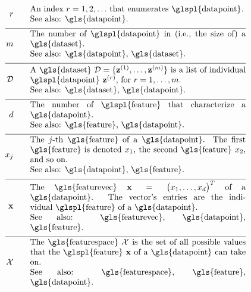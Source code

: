 \begin{align}
	\sampleidx \quad\quad & \parbox{.75\textwidth}{An index $\sampleidx=1,2,\ldots$ that 
		enumerates \glspl{datapoint}.
		\\ See also: \gls{datapoint}. }   \nonumber \\[2mm] \hline \nonumber\\[-5mm]
	\samplesize \quad\quad &\parbox{.75\textwidth}{The number of \glspl{datapoint} in (i.e., the size of) a \gls{dataset}.
		\\ See also: \gls{datapoint}, \gls{dataset}.} \nonumber \\[2mm] \hline \nonumber\\[-5mm] 
	\dataset \quad\quad & \parbox{.75\textwidth}{A \gls{dataset} $\dataset = \{ \datapoint^{(1)},\ldots, \datapoint^{(\samplesize)} \}$ 
		is a list of individual \glspl{datapoint} $\datapoint^{(\sampleidx)}$, for $\sampleidx=1,\ldots,\samplesize$.
		\\ See also: \gls{dataset}, \gls{datapoint}.}   \nonumber \\[2mm] \hline \nonumber\\[-5mm]
	\featurelen \quad\quad &\parbox{.75\textwidth}{The number of \glspl{feature} that characterize a \gls{datapoint}.
		\\ See also: \gls{feature}, \gls{datapoint}.}\nonumber \\[2mm] \hline \nonumber\\[-5mm]
	\feature_{\featureidx} \quad\quad &\parbox{.75\textwidth}{The $\featureidx$-th \gls{feature} of a \gls{datapoint}. The first \gls{feature} 
		is denoted $\feature_{1}$, the second \gls{feature} $\feature_{2}$, and so on.
		\\ See also: \gls{datapoint}, \gls{feature}. } \nonumber \\[2mm] \hline \nonumber\\[-5mm] 
	\featurevec \quad\quad &\parbox{.75\textwidth}{The \gls{featurevec} $\featurevec=\big(\feature_{1},\ldots,\feature_{\featuredim}\big)^{T}$ of a \gls{datapoint}. The vector's entries 
		are the individual \glspl{feature} of a \gls{datapoint}.
		\\ See also: \gls{featurevec}, \gls{datapoint}, \gls{feature}. }\nonumber \\[2mm] \hline \nonumber\\[-5mm]
	\featurespace \quad\quad & \parbox{.75\textwidth}{The \gls{featurespace} $\featurespace$ is 
		the set of all possible values that the \glspl{feature} $\featurevec$ of a \gls{datapoint} can take on.
		\\ See also: \gls{featurespace}, \gls{feature}, \gls{datapoint}.} \nonumber 
\end{align}        


